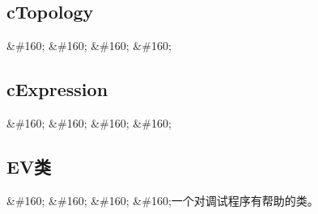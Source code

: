 \subsection{cTopology}
\label{ctopology}

\&\#160; \&\#160; \&\#160; \&\#160;

\subsection{cExpression}
\label{cexpression}

\&\#160; \&\#160; \&\#160; \&\#160;

\subsection{EV类}
\label{ev类}

\&\#160; \&\#160; \&\#160; \&\#160;一个对调试程序有帮助的类。


